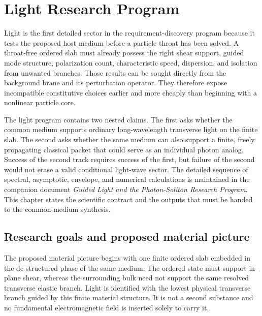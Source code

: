 
\chapter{Light Research Program}
\label{ch:light-research-program}

Light is the first detailed sector in the requirement-discovery program because
it tests the proposed host medium before a particle throat has been solved. A
throat-free ordered slab must already possess the right shear support, guided
mode structure, polarization count, characteristic speed, dispersion, and
isolation from unwanted branches. Those results can be sought directly from the
background brane and its perturbation operator. They therefore expose
incompatible constitutive choices earlier and more cheaply than beginning with
a nonlinear particle core.

The light program contains two nested claims. The first asks whether the common
medium supports ordinary long-wavelength transverse light on the finite slab.
The second asks whether the same medium can also support a finite, freely
propagating classical packet that could serve as an individual photon analog.
Success of the second track requires success of the first, but failure of the
second would not erase a valid conditional light-wave sector. The detailed
sequence of spectral, asymptotic, envelope, and numerical calculations is
maintained in the companion document \emph{Guided Light and the Photon-Soliton
Research Program}. This chapter states the scientific contract and the outputs
that must be handed to the common-medium synthesis.

\section{Research goals and proposed material picture}

The proposed material picture begins with one finite ordered slab embedded in
the de-structured phase of the same medium. The ordered state must support
in-plane shear, whereas the surrounding bulk need not support the same resolved
transverse elastic branch. Light is identified with the lowest physical
transverse branch guided by this finite material structure. It is not a second
substance and no fundamental electromagnetic field is inserted solely to carry
it.

